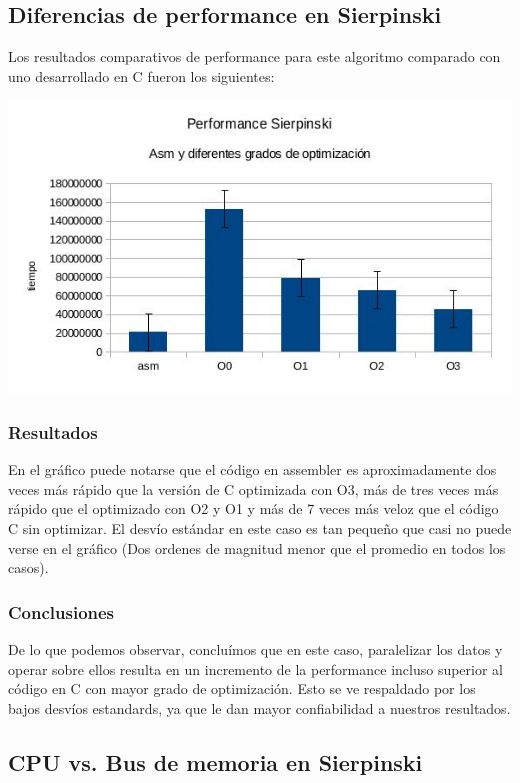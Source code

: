 \documentclass[a4paper]{article}
\begin{document}
\subsection{Diferencias de performance en Sierpinski}

Los resultados comparativos de performance para este algoritmo comparado con uno desarrollado en C fueron los siguientes:

  \begin{center}
  \includegraphics[scale=0.66]{Graficos1.4/sie/per.jpg}
  \end{center}

\subsubsection{Resultados}
En el gráfico puede notarse que el código en assembler es aproximadamente dos veces más rápido que la versión de C optimizada con O3, más de tres veces más rápido que el optimizado con O2 y O1 y más de 7 veces más veloz que el código C sin optimizar. El desvío estándar en este caso es tan pequeño que casi no puede verse en el gráfico (Dos ordenes de magnitud menor que el promedio en todos los casos).
\subsubsection{Conclusiones}

De lo que podemos observar, concluímos que en este caso, paralelizar los datos y operar sobre ellos resulta en un incremento de la performance incluso superior al código en C con mayor grado de optimización. Esto se ve respaldado por los bajos desvíos estandards, ya que le dan mayor confiabilidad a nuestros resultados.

\newpage
\subsection{CPU vs. Bus de memoria en Sierpinski}
\end{document}
